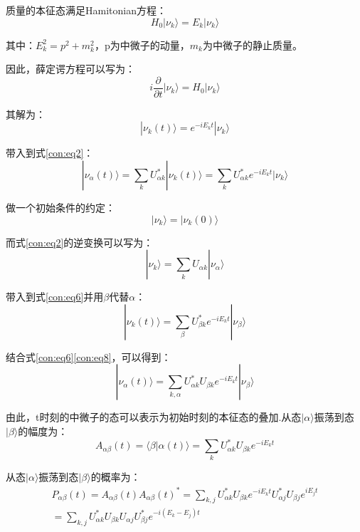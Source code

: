 \documentclass[10pt,a4paper]{article}
\begin{document}
质量的本征态满足Hamitonian方程：
\begin{equation}
\label{con:eq4}
H_{0}|\nu_{k}\rangle=E_{k}|\nu_{k}\rangle
\end{equation}


其中：$E_{k}^2=p^2+m_{k}^2$，p为中微子的动量，$m_{k}$为中微子的静止质量。


因此，薛定谔方程可以写为：
\begin{equation}
\label{con:eq5}
i\frac{\partial}{\partial t}|\nu_{k}\rangle=H_{0}|\nu_{k}\rangle
\end{equation}


其解为：
\begin{equation}
\label{con:eq6}
|\nu_{k}(t)\rangle=e^{-iE_{k}t}|\nu_{k}\rangle
\end{equation}


带入到式\eqref{con:eq2}：
\begin{equation}
\label{con:eq7}
|\nu_{\alpha}(t)\rangle=\sum_{k}U_{\alpha k}^{*}|\nu_{k}(t)\rangle=\sum_{k}U_{\alpha k}^{*}e^{-iE_{k}t}|\nu_{k}\rangle
\end{equation}


做一个初始条件的约定：
\[|\nu_{k}\rangle=|\nu_{k}(0)\rangle\]


而式\eqref{con:eq2}的逆变换可以写为：
\begin{equation}
\label{con:eq8}
|\nu_{k}\rangle=\sum_{k}U_{\alpha k}|\nu_{\alpha}\rangle
\end{equation}


带入到式\eqref{con:eq6}并用$\beta$代替$\alpha$：
\begin{equation}
\label{con:eq9}
|\nu_{k}(t)\rangle=\sum_{\beta}U_{\beta k}^{*}e^{-iE_{k}t}|\nu_{\beta}\rangle
\end{equation}


结合式\eqref{con:eq6}\eqref{con:eq8}，可以得到：
\begin{equation}
\label{con:eq10}
|\nu_{\alpha}(t)\rangle=\sum_{k,\alpha}U_{\alpha k}^{*}U_{\beta k}e^{-iE_{k}t}|\nu_{\beta}\rangle
\end{equation}


由此，t时刻的中微子的态可以表示为初始时刻的本征态的叠加.从态$|\alpha\rangle$振荡到态$|\beta\rangle$的幅度为：
\begin{equation}
\label{con:eq11}
A_{\alpha\beta}(t)=\langle\beta|\alpha(t)\rangle=\sum_{k}U_{\alpha k}^{*}U_{\beta k}e^{-iE_{k}t}
\end{equation}


从态$|\alpha\rangle$振荡到态$|\beta\rangle$的概率为：
\begin{equation}
\label{con:eq12}
\begin{split}
P_{\alpha\beta}(t)=A_{\alpha\beta}(t){A_{\alpha\beta}(t)}^*=\sum_{k,j}U_{\alpha k}^{*}U_{\beta k}e^{-iE_{k}t}U_{\alpha j}^{*}U_{\beta j}e^{iE_{j}t}\\
=\sum_{k,j}U_{\alpha k}^{*}U_{\beta k}U_{\alpha j}U_{\beta j}^{*}e^{-i(E_{k}-E_{j})t}
\end{split}
\end{equation}
\end{document}

